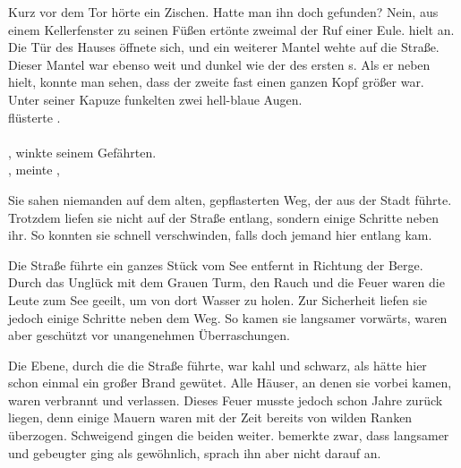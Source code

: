 \begin{Large}
Kurz vor dem Tor hörte {\Eno} ein Zischen. Hatte man ihn doch gefunden? Nein, aus einem Kellerfenster zu seinen Füßen ertönte zweimal der Ruf einer Eule. {\Eno} hielt an. Die Tür des Hauses öffnete sich, und ein weiterer Mantel wehte auf die Straße. Dieser Mantel war ebenso weit und dunkel wie der des ersten {\Schattenlaufer}s. Als er neben {\Eno} hielt, konnte man sehen, dass der zweite {\Schattenlaufer} fast einen ganzen Kopf größer war. Unter seiner Kapuze funkelten zwei hell-blaue Augen.\\
\q{{\Bomar}!} flüsterte {\Eno}. \\
\\
, {\Eno} winkte seinem Gefährten. \\
, meinte {\Bomar}, \\

Sie sahen niemanden auf dem alten, gepflasterten Weg, der aus der Stadt führte. Trotzdem liefen sie nicht auf der Straße entlang, sondern einige Schritte neben ihr. So konnten sie schnell verschwinden, falls doch jemand hier entlang kam. 

Die Straße führte ein ganzes Stück vom See entfernt in Richtung der Berge. Durch das Unglück mit dem Grauen Turm, den Rauch und die Feuer waren die Leute zum See geeilt, um von dort Wasser zu holen. Zur Sicherheit liefen sie jedoch einige Schritte neben dem Weg. So kamen sie langsamer vorwärts, waren aber geschützt vor unangenehmen Überraschungen.

Die Ebene, durch die die Straße führte, war kahl und schwarz, als hätte hier schon einmal ein großer Brand gewütet. Alle Häuser, an denen sie vorbei kamen, waren verbrannt und verlassen. Dieses Feuer musste jedoch schon Jahre zurück liegen, denn einige Mauern waren mit der Zeit bereits von wilden Ranken überzogen. Schweigend gingen die beiden {\Schattenlaufer} weiter. {\Bomar} bemerkte zwar, dass {\Eno} langsamer und gebeugter ging als gewöhnlich, sprach ihn aber nicht darauf an.


\end{Large}
